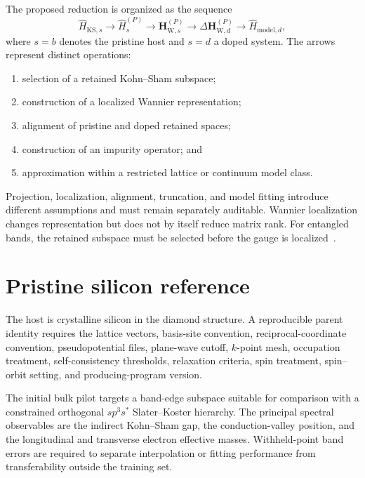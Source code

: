 The proposed reduction is organized as the sequence
\begin{equation}
    \hat H_{\mathrm{KS},s}
    \longrightarrow
    \hat H_s^{(P)}
    \longrightarrow
    \mathbf H_{\mathrm W,s}^{(P)}
    \longrightarrow
    \Delta\mathbf H_{\mathrm W,d}^{(P)}
    \longrightarrow
    \hat H_{\mathrm{model},d},
\end{equation}
where $s=b$ denotes the pristine host and $s=d$ a doped system. The arrows
represent distinct operations:
\begin{enumerate}
    \item selection of a retained Kohn--Sham subspace;
    \item construction of a localized Wannier representation;
    \item alignment of pristine and doped retained spaces;
    \item construction of an impurity operator; and
    \item approximation within a restricted lattice or continuum model class.
\end{enumerate}

Projection, localization, alignment, truncation, and model fitting introduce
different assumptions and must remain separately auditable. Wannier
localization changes representation but does not by itself reduce matrix rank.
For entangled bands, the retained subspace must be selected before the gauge is
localized~\cite{marzari2012,souza2001}.

\section*{Pristine silicon reference}

The host is crystalline silicon in the diamond structure. A reproducible
parent identity requires the lattice vectors, basis-site convention,
reciprocal-coordinate convention, pseudopotential files, plane-wave cutoff,
$k$-point mesh, occupation treatment, self-consistency thresholds, relaxation
criteria, spin treatment, spin--orbit setting, and producing-program version.

The initial bulk pilot targets a band-edge subspace suitable for comparison
with a constrained orthogonal $sp^3s^{\ast}$ Slater--Koster hierarchy. The
principal spectral observables are the indirect Kohn--Sham gap, the
conduction-valley position, and the longitudinal and transverse electron
effective masses. Withheld-point band errors are required to separate
interpolation or fitting performance from transferability outside the training
set.

